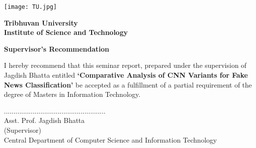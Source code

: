 \begin{titlepage}
    \noindent
    
    \begin{center}
        \texttt{[image: TU.jpg]} \\
        
        \vspace{1cm}
        
        \Large \textbf{Tribhuvan University}\\
        \Large \textbf{Institute of Science and Technology}\\
        
        \vspace{2cm}
        
        \large\textbf {Supervisor's Recommendation} \\
        
        \vspace{0.5cm}
    \end{center}
    
    I hereby recommend that this seminar report, prepared under the supervision of Jagdish Bhatta entitled \textbf{ \lq Comparative Analysis of CNN Variants for Fake News Classification\rq} be accepted as a fulfillment of a partial requirement of the degree of Masters in Information Technology.
    
    \vspace{2cm}
    
    \noindent 
    ..................................................... \\
    Asst. Prof. Jagdish Bhatta\\
    (Supervisor) \\
    Central Department of Computer Science and Information Technology

\end{titlepage}